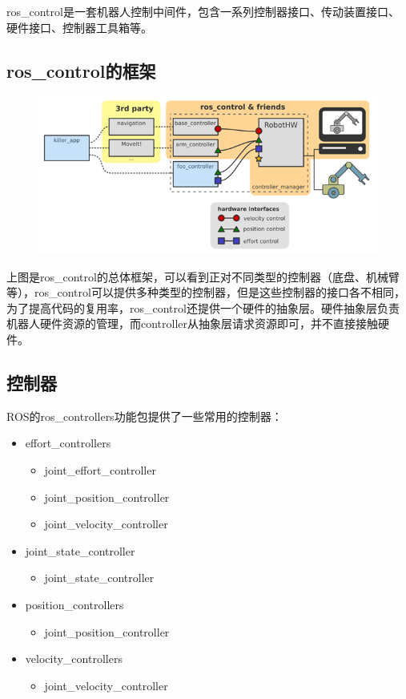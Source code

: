 \documentclass[9pt, oneside]{book}
\begin{document}
ros\_control是一套机器人控制中间件，包含一系列控制器接口、传动装置接口、硬件接口、控制器工具箱等。

\subsection{ros\_control的框架}

\begin{figure}[H]
    \centering
    \includegraphics[width=0.8\linewidth]{image/ros_control.png}
\end{figure}

上图是ros\_control的总体框架，可以看到正对不同类型的控制器（底盘、机械臂等），ros\_control可以提供多种类型的控制器，但是这些控制器的接口各不相同，为了提高代码的复用率，ros\_control还提供一个硬件的抽象层。硬件抽象层负责机器人硬件资源的管理，而controller从抽象层请求资源即可，并不直接接触硬件。

\subsection{控制器}

ROS的ros\_controllers功能包提供了一些常用的控制器：

\begin{itemize}
    \item effort\_controllers
        \begin{itemize}
            \item joint\_effort\_controller
            \item joint\_position\_controller
            \item joint\_velocity\_controller
        \end{itemize}
    \item joint\_state\_controller
        \begin{itemize}
            \item joint\_state\_controller
        \end{itemize}
    \item position\_controllers
        \begin{itemize}
            \item joint\_position\_controller
        \end{itemize}
    \item velocity\_controllers
        \begin{itemize}
            \item joint\_velocity\_controller
        \end{itemize}
\end{itemize}
\end{document}
